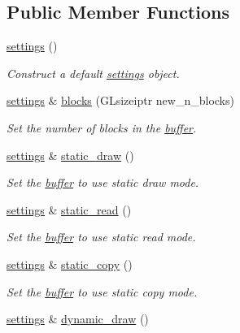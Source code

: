 \subsection*{Public Member Functions}
\begin{DoxyCompactItemize}
\item 
\hyperlink{classgfx_1_1buffer_1_1settings_a4ffcf418fadcec4cdf7eed8a36586969}{settings} ()
\begin{DoxyCompactList}\small\item\em Construct a default \hyperlink{classgfx_1_1buffer_1_1settings}{settings} object. \end{DoxyCompactList}\item 
\hyperlink{classgfx_1_1buffer_1_1settings}{settings} \& \hyperlink{classgfx_1_1buffer_1_1settings_a9bbc624661e309a6d44cf70dcd0869e3}{blocks} (G\-Lsizeiptr new\-\_\-n\-\_\-blocks)
\begin{DoxyCompactList}\small\item\em Set the number of blocks in the \hyperlink{classgfx_1_1buffer}{buffer}. \end{DoxyCompactList}\item 
\hyperlink{classgfx_1_1buffer_1_1settings}{settings} \& \hyperlink{classgfx_1_1buffer_1_1settings_a9b19020f3c57f08f2f5c18c2529fba08}{static\-\_\-draw} ()
\begin{DoxyCompactList}\small\item\em Set the \hyperlink{classgfx_1_1buffer}{buffer} to use static draw mode. \end{DoxyCompactList}\item 
\hyperlink{classgfx_1_1buffer_1_1settings}{settings} \& \hyperlink{classgfx_1_1buffer_1_1settings_accaba3f4ab902e9db70b59cbbce697ce}{static\-\_\-read} ()
\begin{DoxyCompactList}\small\item\em Set the \hyperlink{classgfx_1_1buffer}{buffer} to use static read mode. \end{DoxyCompactList}\item 
\hyperlink{classgfx_1_1buffer_1_1settings}{settings} \& \hyperlink{classgfx_1_1buffer_1_1settings_a25717ec933636b432c895a6de69c82f6}{static\-\_\-copy} ()
\begin{DoxyCompactList}\small\item\em Set the \hyperlink{classgfx_1_1buffer}{buffer} to use static copy mode. \end{DoxyCompactList}\item 
\hyperlink{classgfx_1_1buffer_1_1settings}{settings} \& \hyperlink{classgfx_1_1buffer_1_1settings_a980322e4250c7dde7600de9ca9e0faa6}{dynamic\-\_\-draw} ()

\end{DoxyCompactItemize}
